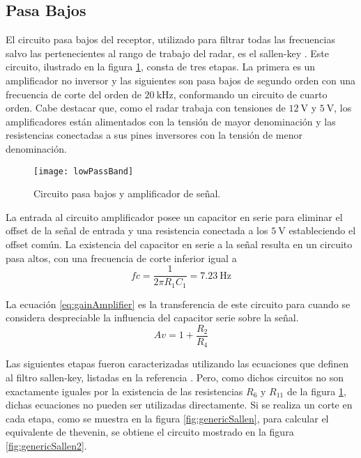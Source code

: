 \subsection{Pasa Bajos}

El circuito pasa bajos del receptor, utilizado para filtrar todas las frecuencias salvo las pertenecientes al rango de trabajo del radar, es el sallen-key \cite{Unwin2003}. Este circuito, ilustrado en la figura \ref{fig:lowPassCircuit}, consta de tres etapas. La primera es un amplificador no inversor y las siguientes son pasa bajos de segundo orden con una frecuencia de corte del orden de $\SI{20}{\kHz}$, conformando un circuito de cuarto orden. Cabe destacar que, como el radar trabaja con tensiones de $\SI{12}{\volt}$ y $\SI{5}{\volt}$, los amplificadores están alimentados con la tensión de mayor denominación y las resistencias conectadas a sus pines inversores con la tensión de menor denominación.

\begin{figure}
 \centering
 \texttt{[image: lowPassBand]}
 \caption{Circuito pasa bajos y amplificador de señal.}
 \label{fig:lowPassCircuit}
\end{figure}

La entrada al circuito amplificador posee un capacitor en serie para eliminar el offset de la señal de entrada y una resistencia conectada a los $\SI{5}{\volt}$ estableciendo el offset común. La existencia del capacitor en serie a la señal resulta en un circuito pasa altos, con una frecuencia de corte inferior igual a
\begin{equation}\label{eq:fcInf}
  fc = \dfrac{1}{2\pi R_1 C_1} = \SI{7.23}{\Hz}
\end{equation}

La ecuación \ref{eq:gainAmplifier} es la transferencia de este circuito para cuando se considera despreciable la influencia del capacitor serie sobre la señal.
\begin{equation}\label{eq:gainAmplifier}
  Av = 1 + \dfrac{R_2}{R_4}
\end{equation}

Las siguientes etapas fueron caracterizadas utilizando las ecuaciones que definen al filtro sallen-key, listadas en la referencia \cite{Unwin2003}. Pero, como dichos circuitos no son exactamente iguales por la existencia de las resistencias $R_6$ y $R_{11}$ de la figura \ref{fig:lowPassCircuit}, dichas ecuaciones no pueden ser utilizadas directamente. Si se realiza un corte en cada etapa, como se muestra en la figura \ref{fig:genericSallen}, para calcular el equivalente de thevenin, se obtiene el circuito mostrado en la figura \ref{fig:genericSallen2}.

